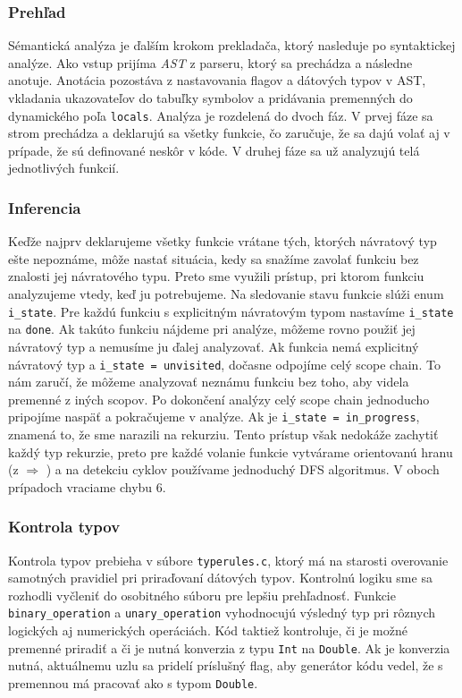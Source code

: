 \documentclass{article}
\begin{document}
    \subsubsection{Prehľad}
        Sémantická analýza je ďalším krokom prekladača, ktorý nasleduje po syntaktickej analýze. Ako vstup prijíma \emph{AST} z parseru, ktorý sa prechádza a následne anotuje. Anotácia pozostáva z nastavovania flagov a dátových typov v AST, vkladania ukazovateľov do tabuľky symbolov a pridávania premenných do dynamického poľa \texttt{locals}. Analýza je rozdelená do dvoch fáz. V prvej fáze sa strom prechádza a deklarujú sa všetky funkcie, čo zaručuje, že sa dajú volať aj v prípade, že sú definované neskôr v kóde. V druhej fáze sa už analyzujú telá jednotlivých funkcií.

    \subsubsection{Inferencia}
        Keďže najprv deklarujeme všetky funkcie vrátane tých, ktorých návratový typ ešte nepoznáme, môže nastať situácia, kedy sa snažíme zavolať funkciu bez znalosti jej návratového typu. Preto sme využili prístup, pri ktorom funkciu analyzujeme vtedy, keď ju potrebujeme. Na sledovanie stavu funkcie slúži enum \texttt{i\_state}. Pre každú funkciu s explicitným návratovým typom nastavíme \texttt{i\_state} na \texttt{done}. Ak takúto funkciu nájdeme pri analýze, môžeme rovno použiť jej návratový typ a nemusíme ju ďalej analyzovať. Ak funkcia nemá explicitný návratový typ a \texttt{i\_state = unvisited}, dočasne odpojíme celý scope chain. To nám zaručí, že môžeme analyzovať neznámu funkciu bez toho, aby videla premenné z iných scopov. Po dokončení analýzy celý scope chain jednoducho pripojíme naspäť a pokračujeme v analýze. Ak je \texttt{i\_state = in\_progress}, znamená to, že sme narazili na rekurziu. Tento prístup však nedokáže zachytiť každý typ rekurzie, preto pre každé volanie funkcie vytvárame orientovanú hranu (z $\Rightarrow$ ) a na detekciu cyklov používame jednoduchý DFS algoritmus. V oboch prípadoch vraciame chybu 6.

    \subsubsection{Kontrola typov}
        Kontrola typov prebieha v súbore \texttt{typerules.c}, ktorý má na starosti overovanie samotných pravidiel pri priraďovaní dátových typov. Kontrolnú logiku sme sa rozhodli vyčleniť do osobitného súboru pre lepšiu prehľadnosť. Funkcie \texttt{binary\_operation} a \texttt{unary\_operation} vyhodnocujú výsledný typ pri rôznych logických aj numerických operáciách. Kód taktiež kontroluje, či je možné premenné priradiť a či je nutná konverzia z typu \texttt{Int} na \texttt{Double}. Ak je konverzia nutná, aktuálnemu uzlu sa pridelí príslušný flag, aby generátor kódu vedel, že s premennou má pracovať ako s typom \texttt{Double}.
\end{document}
